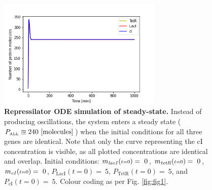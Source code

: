\documentclass[runningheads,a4paper]{llncs}
\begin{document}
\begin{figure}
    \singlespacing
    \centering
    \includegraphics[width=0.70\textwidth]{suplementary_information_and_code/Task2_figure2.png}
    \caption{\textbf{Repressilator ODE simulation of steady-state.} Instead of producing oscillations, the system enters a steady state ($P_{\textrm{\tiny ALL}} \approxeq 240\ [\textrm{molecules}]$) when the initial conditions for all three genes are identical. Note that only the curve representing the cI concentration is visible, as all plotted concentrations are identical and overlap. Initial conditions: $m_{\textrm{\textit{lacI}}}({\scriptstyle t=0}) =\ 0$, $m_{\textrm{\textit{tetR}}}({\scriptstyle t=0}) =\ 0$, $m_{\textrm{\textit{cI}}}({\scriptstyle t=0}) =\ 0$, $P_{\textrm{LacI}}({\scriptstyle t=0}) =\ 5$, $P_{\textrm{TetR}}({\scriptstyle t=0}) =\ 5$, and $P_{\textrm{cI}}({\scriptstyle t=0}) =\ 5$. Colour coding as per Fig. \ref{fig:fig1}.}  
    \label{fig:fig5}
\end{figure}
\end{document}
